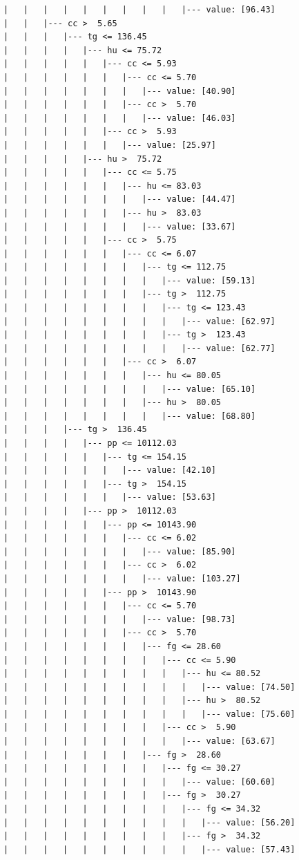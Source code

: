\documentclass[UTF8, a4paper]{ctexart}
\begin{document}
\begin{lstlisting}
|   |   |   |   |   |   |   |   |   |--- value: [96.43]
|   |   |--- cc >  5.65
|   |   |   |--- tg <= 136.45
|   |   |   |   |--- hu <= 75.72
|   |   |   |   |   |--- cc <= 5.93
|   |   |   |   |   |   |--- cc <= 5.70
|   |   |   |   |   |   |   |--- value: [40.90]
|   |   |   |   |   |   |--- cc >  5.70
|   |   |   |   |   |   |   |--- value: [46.03]
|   |   |   |   |   |--- cc >  5.93
|   |   |   |   |   |   |--- value: [25.97]
|   |   |   |   |--- hu >  75.72
|   |   |   |   |   |--- cc <= 5.75
|   |   |   |   |   |   |--- hu <= 83.03
|   |   |   |   |   |   |   |--- value: [44.47]
|   |   |   |   |   |   |--- hu >  83.03
|   |   |   |   |   |   |   |--- value: [33.67]
|   |   |   |   |   |--- cc >  5.75
|   |   |   |   |   |   |--- cc <= 6.07
|   |   |   |   |   |   |   |--- tg <= 112.75
|   |   |   |   |   |   |   |   |--- value: [59.13]
|   |   |   |   |   |   |   |--- tg >  112.75
|   |   |   |   |   |   |   |   |--- tg <= 123.43
|   |   |   |   |   |   |   |   |   |--- value: [62.97]
|   |   |   |   |   |   |   |   |--- tg >  123.43
|   |   |   |   |   |   |   |   |   |--- value: [62.77]
|   |   |   |   |   |   |--- cc >  6.07
|   |   |   |   |   |   |   |--- hu <= 80.05
|   |   |   |   |   |   |   |   |--- value: [65.10]
|   |   |   |   |   |   |   |--- hu >  80.05
|   |   |   |   |   |   |   |   |--- value: [68.80]
|   |   |   |--- tg >  136.45
|   |   |   |   |--- pp <= 10112.03
|   |   |   |   |   |--- tg <= 154.15
|   |   |   |   |   |   |--- value: [42.10]
|   |   |   |   |   |--- tg >  154.15
|   |   |   |   |   |   |--- value: [53.63]
|   |   |   |   |--- pp >  10112.03
|   |   |   |   |   |--- pp <= 10143.90
|   |   |   |   |   |   |--- cc <= 6.02
|   |   |   |   |   |   |   |--- value: [85.90]
|   |   |   |   |   |   |--- cc >  6.02
|   |   |   |   |   |   |   |--- value: [103.27]
|   |   |   |   |   |--- pp >  10143.90
|   |   |   |   |   |   |--- cc <= 5.70
|   |   |   |   |   |   |   |--- value: [98.73]
|   |   |   |   |   |   |--- cc >  5.70
|   |   |   |   |   |   |   |--- fg <= 28.60
|   |   |   |   |   |   |   |   |--- cc <= 5.90
|   |   |   |   |   |   |   |   |   |--- hu <= 80.52
|   |   |   |   |   |   |   |   |   |   |--- value: [74.50]
|   |   |   |   |   |   |   |   |   |--- hu >  80.52
|   |   |   |   |   |   |   |   |   |   |--- value: [75.60]
|   |   |   |   |   |   |   |   |--- cc >  5.90
|   |   |   |   |   |   |   |   |   |--- value: [63.67]
|   |   |   |   |   |   |   |--- fg >  28.60
|   |   |   |   |   |   |   |   |--- fg <= 30.27
|   |   |   |   |   |   |   |   |   |--- value: [60.60]
|   |   |   |   |   |   |   |   |--- fg >  30.27
|   |   |   |   |   |   |   |   |   |--- fg <= 34.32
|   |   |   |   |   |   |   |   |   |   |--- value: [56.20]
|   |   |   |   |   |   |   |   |   |--- fg >  34.32
|   |   |   |   |   |   |   |   |   |   |--- value: [57.43]
\end{lstlisting}
\end{document}
